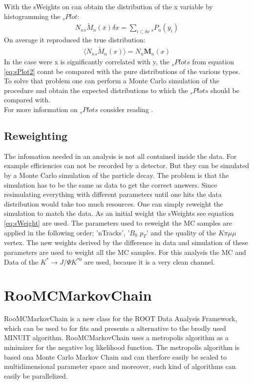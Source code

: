\documentclass[english]{uzhpub}
\begin{document}
With the sWeights on can obtain the distribution of the x variable by histogramming the $_s Plot$:
\begin{align}
  N_n { }_{s} \tilde{M}_n (\bar{x}) \delta x = \sum_{i \subset \delta x} { }_{s} P_n (y_i) \label{eq:sPlot2}
\end{align}
On average it reproduced the true distribution:
\begin{align}
  \langle N_n { }_s \tilde{M}_n (x) \rangle = N_n \textbf{M}_n (x)
\end{align}
In the case were x is significantly correlated with y, the $_s Plots$ from equation \ref{eq:sPlot2} connt be compared with the pure distributions of the various types. To solve that problem one can perform a Monte Carlo simulation of the procedure and obtain the expected distributions to which the $_s Plots$ should be compared with. \\
For more information on $_s Plots$ consider reading \cite{bib:sPlot}.


\subsection{Reweighting}
The infomation needed in an analysis is not all contained inside the data. For example efficiencies can not be recorded by a detector. But they can be simulated by a Monte Carlo simulation of the particle decay. The problem is that the simulation has to be the same as data to get the correct answers. Since resimulating everything with different parameters until one hits the data distribution would take too much resources. One can simply reweight the simulation to match the data. As an initial weight the sWeights see equation \ref{eq:sWeight} are used. The parameters used to reweight the MC samples are applied in the following order: 'nTracks', '$B_0$ $p_T$' and the quality of the $K \pi \mu \mu$ vertex. The new weights derived by the difference in data and simulation of these parameters are used to weight all the MC samples. For this analysis the MC and Data of the $K^* \rightarrow J/ \Psi K^{*0}$ are used, because it is a very clean channel.




\section{RooMCMarkovChain}
RooMCMarkovChain is a new class for the ROOT Data Analysis Framework, which can be used to for fits and presents a alternative to the brodly used MINUIT algorithm. RooMCMarkovChain uses a metropolis algorithm as a minimizer for the negative log likelihood function. The metropolis algorithm is based ona Monte Carlo Markov Chain and can therfore easily be scaled to multidimensional parameter space and moreover, such kind of algorithms can easily be parallelized.
\end{document}
